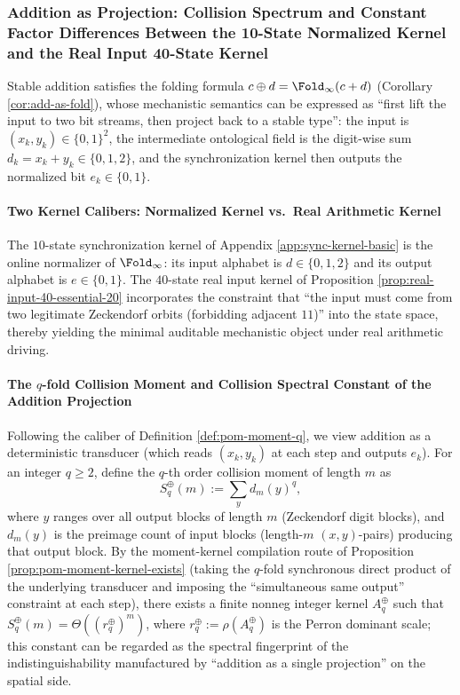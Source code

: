 \subsubsection{Addition as Projection: Collision Spectrum and Constant Factor Differences Between the 10-State Normalized Kernel and the Real Input 40-State Kernel}
\label{app:real-input-40-addition-collision-spectrum}

Stable addition satisfies the folding formula
\(
c\oplus d=\Fold_\infty(c+d)
\)
(Corollary \ref{cor:add-as-fold}), whose mechanistic semantics can be expressed as ``first lift the input to two bit streams, then project back to a stable type'':
the input is \((x_k,y_k)\in\{0,1\}^2\), the intermediate ontological field is the digit-wise sum \(d_k=x_k+y_k\in\{0,1,2\}\), and the synchronization kernel then outputs the normalized bit \(e_k\in\{0,1\}\).

\paragraph{Two Kernel Calibers: Normalized Kernel vs.\ Real Arithmetic Kernel}
The $10$-state synchronization kernel of Appendix \ref{app:sync-kernel-basic} is the online normalizer of \(\Fold_\infty\): its input alphabet is \(d\in\{0,1,2\}\) and its output alphabet is \(e\in\{0,1\}\).
The \(40\)-state real input kernel of Proposition \ref{prop:real-input-40-essential-20} incorporates the constraint that ``the input must come from two legitimate Zeckendorf orbits (forbidding adjacent \(11\))'' into the state space,
thereby yielding the minimal auditable mechanistic object under real arithmetic driving.

\paragraph{The \texorpdfstring{$q$}{q}-fold Collision Moment and Collision Spectral Constant of the Addition Projection}
Following the caliber of Definition \ref{def:pom-moment-q}, we view addition as a deterministic transducer (which reads \((x_k,y_k)\) at each step and outputs \(e_k\)).
For an integer \(q\ge 2\), define the \(q\)-th order collision moment of length \(m\) as
\[
S_q^{\oplus}(m):=\sum_{y} d_m(y)^q,
\]
where \(y\) ranges over all output blocks of length \(m\) (Zeckendorf digit blocks), and \(d_m(y)\) is the preimage count of input blocks (length-\(m\) \((x,y)\)-pairs) producing that output block.
By the moment-kernel compilation route of Proposition \ref{prop:pom-moment-kernel-exists} (taking the \(q\)-fold synchronous direct product of the underlying transducer and imposing the ``simultaneous same output'' constraint at each step), there exists a finite nonneg integer kernel \(A_q^{\oplus}\) such that
\(
S_q^{\oplus}(m)=\Theta((r_q^{\oplus})^m)
\), where
\(
r_q^{\oplus}:=\rho(A_q^{\oplus})
\)
is the Perron dominant scale; this constant can be regarded as the spectral fingerprint of the indistinguishability manufactured by ``addition as a single projection'' on the spatial side.

